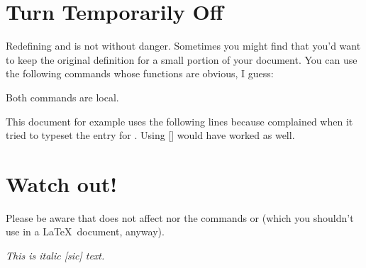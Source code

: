 \documentclass[DIV10,toc=index,toc=bib]{cnpkgdoc}
\begin{document}
\section{Turn \embrac Temporarily Off}
Redefining  and  is not without danger. Sometimes you might
find that you'd want to keep the original definition for a small portion of your
document. You can use the following commands whose functions are obvious, I guess:
\begin{beschreibung}
\end{beschreibung}
Both commands are local.

This document for example uses the following lines because 
complained when it tried to typeset the entry for \cite{bringhurst04}. Using
[] would have worked as well.
\begin{beispiel}
 \EmbracOff
 \printbibliography
\end{beispiel}

\section{Watch out!}
Please be aware that \embrac does not affect  nor the commands
 or  (which you shouldn't use in a \LaTeX\ document, anyway).
\begin{beispiel}
 \itshape This is italic [sic] text.
\end{beispiel}

\EmbracOff
\printbibliography


\printindex
\end{document}
